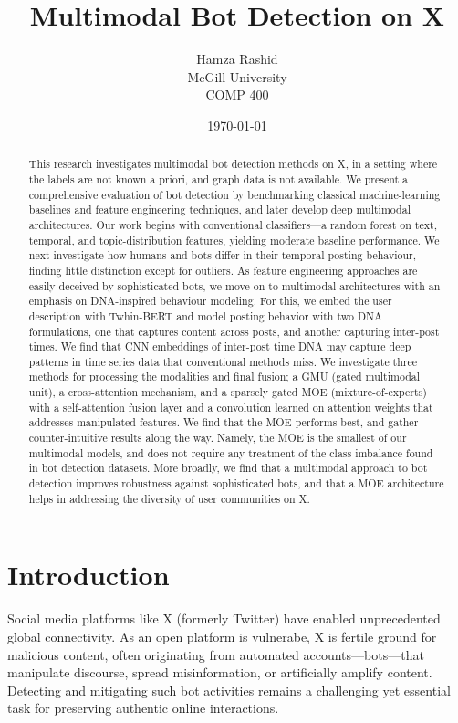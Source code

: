 \documentclass[conference]{IEEEtran}
\title{Multimodal Bot Detection on X}
\author{Hamza Rashid \\ McGill University \\ COMP 400}
\date{\today}
\begin{document}
\maketitle

\begin{abstract}
This research investigates multimodal bot
detection methods on X, in a setting where
the labels are not known a priori, and graph data is not available.
We present a comprehensive evaluation of bot detection 
by benchmarking classical machine-learning baselines
and feature engineering techniques, 
and later develop deep multimodal architectures. 
Our work begins with conventional classifiers---a random forest 
on text, temporal, and topic-distribution features, 
yielding moderate baseline performance. 
We next investigate how humans and bots differ in their 
temporal posting behaviour, finding little
distinction except for outliers. As
feature engineering approaches are easily deceived by sophisticated bots, 
we move on to multimodal architectures with an emphasis on DNA-inspired 
behaviour modeling. For this, we embed the user description with 
Twhin-BERT and model posting behavior with two DNA formulations, 
one that captures content across posts, and another capturing inter-post times.
We find that CNN embeddings of inter-post time DNA may capture deep
patterns in time series data that conventional methods miss.
We investigate three methods for processing the modalities 
and final fusion; a GMU (gated multimodal unit), 
a cross-attention mechanism, and a sparsely gated MOE (mixture-of-experts) 
with a self-attention fusion layer and a convolution learned on attention weights
that addresses manipulated features. 
We find that the MOE performs best, and gather counter-intuitive results along the way. 
Namely, the MOE is the smallest of our multimodal models, and does not require any treatment
of the class imbalance found in bot detection datasets. 
More broadly, we find that a multimodal approach to bot detection 
improves robustness against sophisticated bots, and that a MOE
architecture helps in addressing the diversity of user communities on X. 
\end{abstract}

\section{Introduction}
Social media platforms like X (formerly Twitter) have 
enabled unprecedented global connectivity. 
As an open platform is vulnerabe, X is fertile ground for malicious content,
often originating from automated accounts—bots—that manipulate discourse, spread misinformation, or artificially amplify content. 
Detecting and mitigating such bot activities remains a challenging yet essential task for preserving authentic online interactions.
\end{document}
